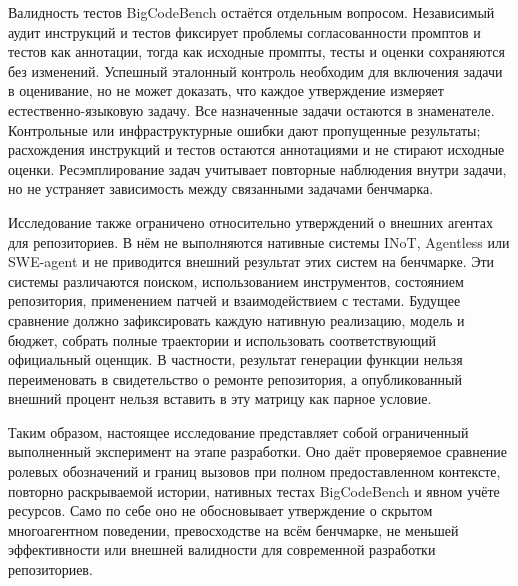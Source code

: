 Валидность тестов BigCodeBench остаётся отдельным вопросом. Независимый аудит инструкций и тестов фиксирует проблемы согласованности промптов и тестов как аннотации, тогда как исходные промпты, тесты и оценки сохраняются без изменений. Успешный эталонный контроль необходим для включения задачи в оценивание, но не может доказать, что каждое утверждение измеряет естественно-языковую задачу. Все назначенные задачи остаются в знаменателе. Контрольные или инфраструктурные ошибки дают пропущенные результаты; расхождения инструкций и тестов остаются аннотациями и не стирают исходные оценки. Ресэмплирование задач учитывает повторные наблюдения внутри задачи, но не устраняет зависимость между связанными задачами бенчмарка.

Исследование также ограничено относительно утверждений о внешних агентах для репозиториев. В нём не выполняются нативные системы INoT, Agentless или SWE-agent и не приводится внешний результат этих систем на бенчмарке. Эти системы различаются поиском, использованием инструментов, состоянием репозитория, применением патчей и взаимодействием с тестами. Будущее сравнение должно зафиксировать каждую нативную реализацию, модель и бюджет, собрать полные траектории и использовать соответствующий официальный оценщик. В частности, результат генерации функции нельзя переименовать в свидетельство о ремонте репозитория, а опубликованный внешний процент нельзя вставить в эту матрицу как парное условие.

Таким образом, настоящее исследование представляет собой ограниченный выполненный эксперимент на этапе разработки. Оно даёт проверяемое сравнение ролевых обозначений и границ вызовов при полном предоставленном контексте, повторно раскрываемой истории, нативных тестах BigCodeBench и явном учёте ресурсов. Само по себе оно не обосновывает утверждение о скрытом многоагентном поведении, превосходстве на всём бенчмарке, не меньшей эффективности или внешней валидности для современной разработки репозиториев.
